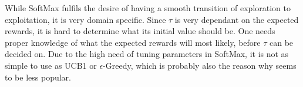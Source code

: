 While SoftMax fulfils the desire of having a smooth transition of exploration to exploitation, it is very domain specific. Since $\tau$ is very dependant on the expected rewards, it is hard to determine what its initial value should be. One needs proper knowledge of what the expected rewards will most likely, before $\tau$ can be decided on. Due to the high need of tuning parameters in SoftMax, it is not as simple to use as UCB1 or $\epsilon$-Greedy, which is probably also the reason why seems to be less popular.